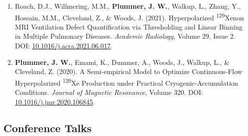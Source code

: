 \documentclass[12pt,]{scrartcl}
\begin{document}
\begin{enumerate}
    \item Roach, D.J., Willmering, M.M., \textbf{Plummer, J. W.}, Walkup, L., Zhang, Y., Hossain, M.M., Cleveland, Z., \& Woods, J. (2021). Hyperpolarized \textsuperscript{129}Xenon MRI Ventilation Defect Quantification via Thresholding and Linear Binning in Multiple Pulmonary Diseases. \textit{Academic Radiology}, Volume 29, Issue 2. DOI: \href{https://doi.org/10.1016/j.acra.2021.06.017}{10.1016/j.acra.2021.06.017}.
    
    \item \textbf{Plummer, J. W.}, Emami, K., Dummer, A., Woods, J., Walkup, L., \& Cleveland, Z. (2020). A Semi-empirical Model to Optimize Continuous-Flow Hyperpolarized \textsuperscript{129}Xe Production under Practical Cryogenic-Accumulation Conditions. \textit{Journal of Magnetic Resonance}, Volume 320. DOI: \href{https://doi.org/10.1016/j.jmr.2020.106845}{10.1016/j.jmr.2020.106845}.

\end{enumerate}

\subsection{Conference Talks}\label{conferences_presentations}
\end{document}
